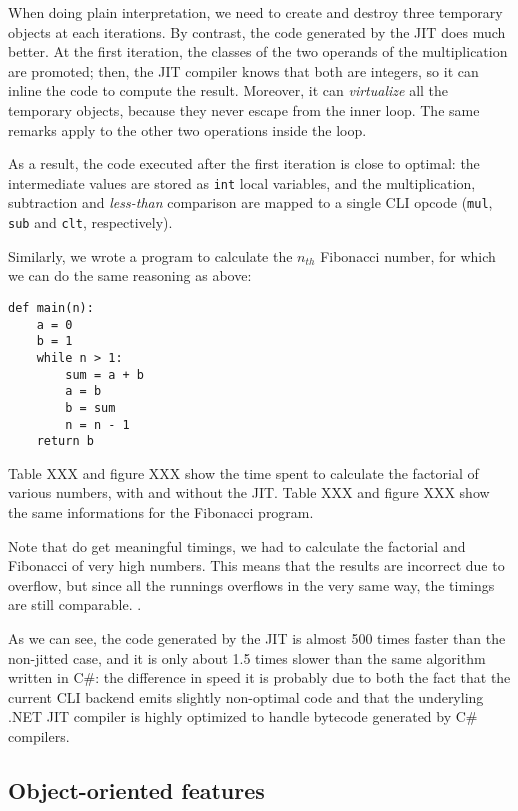 When doing plain interpretation, we need to create and destroy three temporary
objects at each iterations.  By contrast, the code generated by the JIT does
much better.  At the first iteration, the classes of the two operands of the
multiplication are promoted; then, the JIT compiler knows that both are
integers, so it can inline the code to compute the result.  Moreover, it can
\emph{virtualize} all the temporary objects, because they never escape from
the inner loop.  The same remarks apply to the other two operations inside
the loop.

As a result, the code executed after the first iteration is close to optimal:
the intermediate values are stored as \lstinline{int} local variables, and the
multiplication, subtraction and \emph{less-than} comparison are mapped to a
single CLI opcode (\lstinline{mul}, \lstinline{sub} and \lstinline{clt},
respectively).

Similarly, we wrote a program to calculate the $n_{th}$ Fibonacci number, for
which we can do the same reasoning as above:

\begin{lstlisting}
def main(n):
    a = 0
    b = 1
    while n > 1:
        sum = a + b
        a = b
        b = sum
        n = n - 1
    return b
\end{lstlisting}



Table XXX and figure XXX show the time spent to calculate the factorial of
various numbers, with and without the JIT.  Table XXX and figure XXX show the
same informations for the Fibonacci program.

Note that do get meaningful timings, we had to calculate the factorial and
Fibonacci of very high numbers.  This means that the results are incorrect due
to overflow, but since all the runnings overflows in the very same way, the
timings are still comparable. .

As we can see, the code generated by the JIT is almost 500 times faster than
the non-jitted case, and it is only about 1.5 times slower than the same
algorithm written in C\#: the difference in speed it is probably due to both
the fact that the current CLI backend emits slightly non-optimal code and that
the underyling .NET JIT compiler is highly optimized to handle bytecode
generated by C\# compilers.

\subsection{Object-oriented features}

